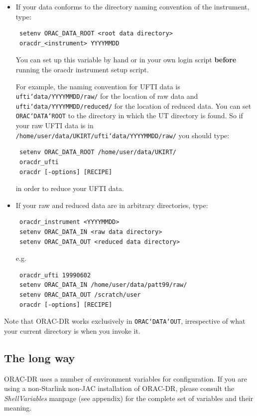 \documentclass[twoside,11pt]{article}
\renewcommand{\_}{\texttt{\symbol{95}}}
\begin{document}
\begin{itemize}

\item
If your data conforms to the directory naming convention of the
instrument, type:
\begin{verbatim}
 setenv ORAC_DATA_ROOT <root data directory>
 oracdr_<instrument> YYYYMMDD
\end{verbatim}

You can set up this variable by hand or in your own login script
{\bf before} running the oracdr instrument setup script.

For example, the naming convention for UFTI data is
{\tt ufti\char`\_data/YYYYMMDD/raw/} for the location of raw data and
{\tt ufti\char`\_data/YYYYMMDD/reduced/} for the location of reduced data. You can
set {\tt ORAC\char`\_DATA\char`\_ROOT} to the directory in which the UT directory is
found. So if your raw UFTI data is in
{\tt /home/user/data/UKIRT/ufti\char`\_data/YYYYMMDD/raw/} you should type:
\begin{verbatim}
 setenv ORAC_DATA_ROOT /home/user/data/UKIRT/
 oracdr_ufti
 oracdr [-options] [RECIPE]
\end{verbatim}

in order to reduce your UFTI data.

\item
If your raw and reduced data are in arbitrary directories, type:
\begin{verbatim}
 oracdr_instrument <YYYYMMDD>
 setenv ORAC_DATA_IN <raw data directory>
 setenv ORAC_DATA_OUT <reduced data directory>
\end{verbatim}

e.g. 
\begin{verbatim}
 oracdr_ufti 19990602
 setenv ORAC_DATA_IN /home/user/data/patt99/raw/
 setenv ORAC_DATA_OUT /scratch/user
 oracdr [-options] [RECIPE]
\end{verbatim}

\end{itemize}

Note that ORAC-DR works exclusively in {\tt ORAC\char`\_DATA\char`\_OUT}, irrespective of
what your current directory is when you invoke it.

\subsection*{The long way}%

ORAC-DR uses a number of environment variables for configuration. If
you are using a non-Starlink non-JAC installation of ORAC-DR, please
consult the {\em ShellVariables\/} manpage (see appendix) for the complete set of
variables and their meaning.
\end{document}
